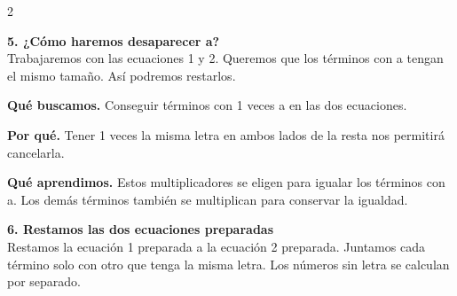 \documentclass[11pt,a4paper,landscape]{article}
\begin{document}
\begin{multicols*}{2}
\noindent\begin{minipage}{\linewidth}\textbf{5. ¿Cómo haremos desaparecer a?}\\[2pt]Trabajaremos con las ecuaciones 1 y 2. Queremos que los términos con a tengan el mismo tamaño. Así podremos restarlos.
\par\smallskip\textbf{Qué buscamos.} Conseguir términos con 1 veces a en las dos ecuaciones.
\par\smallskip\textbf{Por qué.} Tener 1 veces la misma letra en ambos lados de la resta nos permitirá cancelarla.
\par{}\par\smallskip
\par\smallskip\textbf{Qué aprendimos.} Estos multiplicadores se eligen para igualar los términos con a. Los demás términos también se multiplican para conservar la igualdad.
\end{minipage}\par\medskip
\noindent\begin{minipage}{\linewidth}\textbf{6. Restamos las dos ecuaciones preparadas}\\[2pt]Restamos la ecuación 1 preparada a la ecuación 2 preparada. Juntamos cada término solo con otro que tenga la misma letra. Los números sin letra se calculan por separado.
\par{}\par\smallskip

\end{minipage}
\end{multicols*}
\end{document}
